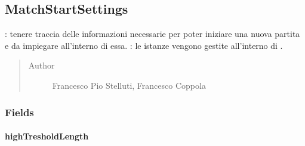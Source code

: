 \documentclass[letterpaper,10pt,italian,openany,oneside]{sphinxmanual}
\begin{document}
\subsection{MatchStartSettings}
\label{\detokenize{test/it/unicam/cs/pa/mastermind/gamecore/MatchStartSettings:matchstartsettings}}\label{\detokenize{test/it/unicam/cs/pa/mastermind/gamecore/MatchStartSettings::doc}}

\begin{fulllineitems}
\label{\detokenize{test/it/unicam/cs/pa/mastermind/gamecore/MatchStartSettings:it.unicam.cs.pa.mastermind.gamecore.MatchStartSettings}}
: tenere traccia delle informazioni necessarie per poter iniziare una nuova partita e da impiegare all’interno di essa. : le istanze vengono gestite all’interno di .
\begin{quote}\begin{description}
\item[{Author}] \leavevmode
Francesco Pio Stelluti, Francesco Coppola

\end{description}\end{quote}

\end{fulllineitems}



\subsubsection{Fields}
\label{\detokenize{test/it/unicam/cs/pa/mastermind/gamecore/MatchStartSettings:fields}}

\paragraph{highTresholdLength}
\label{\detokenize{test/it/unicam/cs/pa/mastermind/gamecore/MatchStartSettings:hightresholdlength}}

\begin{fulllineitems}
\label{\detokenize{test/it/unicam/cs/pa/mastermind/gamecore/MatchStartSettings:it.unicam.cs.pa.mastermind.gamecore.MatchStartSettings.highTresholdLength}}
\end{fulllineitems}
\end{document}
